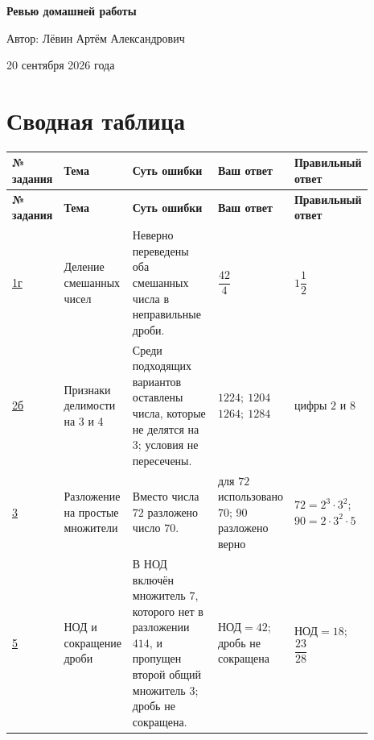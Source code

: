 \documentclass[12pt,a4paper]{article}
\begin{document}
\begin{titlepage}
\thispagestyle{fancy}
\centering
\vspace*{0.24\textheight}
{\Huge\bfseries Ревью домашней работы\par}
\vspace{1.8cm}
{\large Автор: Лёвин Артём Александрович\par}
\vspace{0.7cm}
{\large 20 сентября 2026 года\par}
\vfill
{}
\vspace{0.6cm}
\end{titlepage}

\newpage
\section*{Сводная таблица}
\small
\setlength{\tabcolsep}{3pt}
\begin{longtable}{P{0.07\linewidth} P{0.18\linewidth} P{0.28\linewidth} P{0.18\linewidth} P{0.18\linewidth}}
\toprule
\textbf{№ задания} & \textbf{Тема} & \textbf{Суть ошибки} & \textbf{Ваш ответ} & \textbf{Правильный ответ} \\
\midrule
\endfirsthead
\toprule
\textbf{№ задания} & \textbf{Тема} & \textbf{Суть ошибки} & \textbf{Ваш ответ} & \textbf{Правильный ответ} \\
\midrule
\endhead
\hyperref[task:1g]{1г} & Деление смешанных чисел & Неверно переведены оба смешанных числа в неправильные дроби. & $\dfrac{42}{4}$ & $1\dfrac{1}{2}$ \\
\addlinespace
\hyperref[task:2b]{2б} & Признаки делимости на 3 и 4 & Среди подходящих вариантов оставлены числа, которые не делятся на 3; условия не пересечены. & $1224;\ 1204$\newline $1264;\ 1284$ & цифры $2$ и $8$ \\
\addlinespace
\hyperref[task:3]{3} & Разложение на простые множители & Вместо числа $72$ разложено число $70$. & для $72$ использовано $70$; $90$ разложено верно & $72=2^3\cdot3^2$; $90=2\cdot3^2\cdot5$ \\
\addlinespace
\hyperref[task:5]{5} & НОД и сокращение дроби & В НОД включён множитель $7$, которого нет в разложении $414$, и пропущен второй общий множитель $3$; дробь не сокращена. & $\text{НОД}=42$; дробь не сокращена & $\text{НОД}=18$; $\dfrac{23}{28}$ \\
\bottomrule
\end{longtable}
\normalsize
\end{document}
